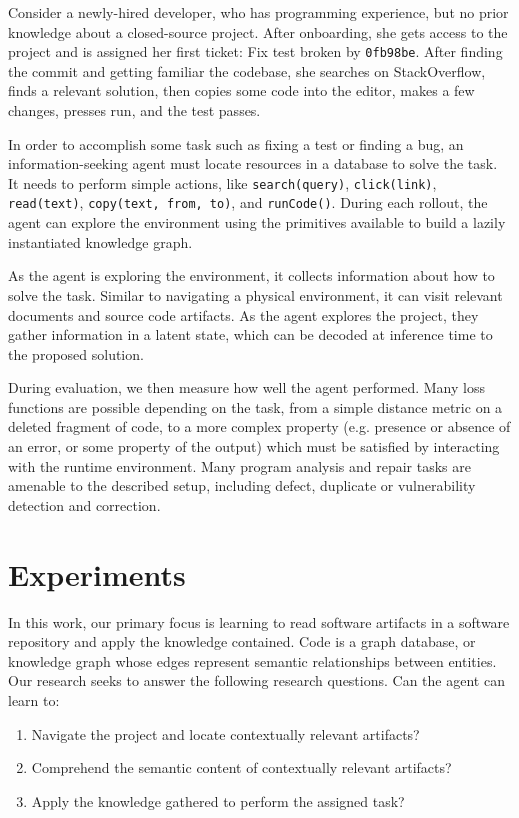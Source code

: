 \documentclass[11pt]{article}
\begin{document}
Consider a newly-hired developer, who has programming experience, but no prior knowledge about a closed-source project. After onboarding, she gets access to the project and is assigned her first ticket: Fix test broken by \texttt{0fb98be}. After finding the commit and getting familiar the codebase, she searches on StackOverflow, finds a relevant solution, then copies some code into the editor, makes a few changes, presses run, and the test passes.

In order to accomplish some task such as fixing a test or finding a bug, an information-seeking agent must locate resources in a database to solve the task. It needs to perform simple actions, like \texttt{search(query)}, \texttt{click(link)}, \texttt{read(text)}, \texttt{copy(text, from, to)}, and \texttt{runCode()}. During each rollout, the agent can explore the environment using the primitives available to build a lazily instantiated knowledge graph.

As the agent is exploring the environment, it collects information about how to solve the task. Similar to navigating a physical environment, it can visit relevant documents and source code artifacts. As the agent explores the project, they gather information in a latent state, which can be decoded at inference time to the proposed solution.

During evaluation, we then measure how well the agent performed. Many loss functions are possible depending on the task, from a simple distance metric on a deleted fragment of code, to a more complex property (e.g. presence or absence of an error, or some property of the output) which must be satisfied by interacting with the runtime environment. Many program analysis and repair tasks are amenable to the described setup, including defect, duplicate or vulnerability detection and correction.

\section{Experiments}

In this work, our primary focus is learning to read software artifacts in a software repository and apply the knowledge contained. Code is a graph database, or knowledge graph whose edges represent semantic relationships between entities. Our research seeks to answer the following research questions. Can the agent can learn to:

\begin{enumerate}
  \item Navigate the project and locate contextually relevant artifacts?
  \item Comprehend the semantic content of contextually relevant artifacts?
  \item Apply the knowledge gathered to perform the assigned task?
\end{enumerate}
\end{document}
